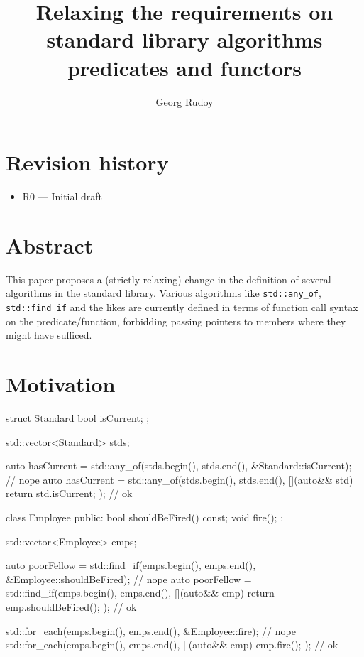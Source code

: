 \documentclass{wg21}
\title{Relaxing the requirements on standard library algorithms predicates and functors}
\author{Georg Rudoy}{georgii.rudoi@phystech.edu}
\newcommand{\cc}[1]{\texttt{#1}}
\begin{document}
\maketitle

\section{Revision history}
\begin{itemize}
  \item R0 --- Initial draft
\end{itemize}

\section{Abstract}

This paper proposes a (strictly relaxing) change in the definition of several
algorithms in the standard library. Various algorithms like \cc{std::any_of},
\cc{std::find_if} and the likes are currently defined in terms of function call
syntax on the predicate/function, forbidding passing pointers to members where
they might have sufficed.

\section{Motivation}

\begin{cpp}
  struct Standard
  {
      bool isCurrent;
  };

  std::vector<Standard> stds;

  auto hasCurrent = std::any_of(stds.begin(), stds.end(),
          &Standard::isCurrent);                                // nope
  auto hasCurrent = std::any_of(stds.begin(), stds.end(),
          [](auto&& std) { return std.isCurrent; });            // ok 
\end{cpp}

\begin{cpp}
  class Employee
  {
  public:
      bool shouldBeFired() const;
      void fire();
  };

  std::vector<Employee> emps;

  auto poorFellow = std::find_if(emps.begin(), emps.end(),
          &Employee::shouldBeFired);                            // nope
  auto poorFellow = std::find_if(emps.begin(), emps.end(),
          [](auto&& emp) { return emp.shouldBeFired(); });      // ok

  std::for_each(emps.begin(), emps.end(), &Employee::fire);     // nope
  std::for_each(emps.begin(), emps.end(),
          [](auto&& emp) { emp.fire(); });                      // ok
\end{cpp}
\end{document}
